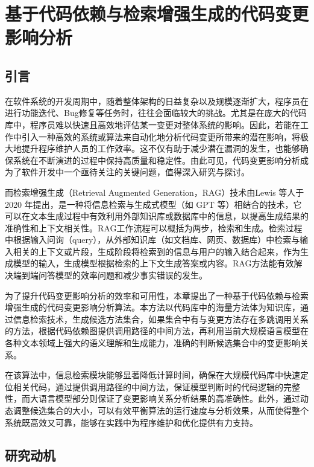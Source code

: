 \chapter{基于代码依赖与检索增强生成的代码变更影响分析}

\section{引言}

在软件系统的开发周期中，随着整体架构的日益复杂以及规模逐渐扩大，程序员在进行功能迭代、Bug修复等任务时，往往会面临较大的挑战。尤其是在庞大的代码库中，程序员难以快速且高效地评估某一变更对整体系统的影响。因此，若能在工作中引入一种高效的系统或算法来自动化地分析代码变更所带来的潜在影响，将极大地提升程序维护人员的工作效率。这不仅有助于减少潜在漏洞的发生，也能够确保系统在不断演进的过程中保持高质量和稳定性。由此可见，代码变更影响分析成为了软件开发中一个亟待关注的关键问题，值得深入研究与探讨。

而检索增强生成（Retrieval Augmented Generation，RAG）技术由Lewis 等人\cite{2020Retrieval}于 2020 年提出，是一种将信息检索与生成式模型（如 GPT 等）相结合的技术，它可以在文本生成过程中有效利用外部知识库或数据库中的信息，以提高生成结果的准确性和上下文相关性。RAG工作流程可以概括为两步，检索和生成。检索过程中根据输入问询（query），从外部知识库（如文档库、网页、数据库）中检索与输入相关的上下文或片段，生成阶段将检索到的信息与用户的输入结合起来，作为生成模型的输入，生成模型根据检索的上下文生成答案或内容。RAG方法能有效解决端到端问答模型的效率问题和减少事实错误的发生。

为了提升代码变更影响分析的效率和可用性，本章提出了一种基于代码依赖与检索增强生成的代码变更影响分析算法。本方法以代码库中的海量方法体为知识库，通过信息检索技术，生成候选方法集合，如果集合中有与变更方法存在多跳调用关系的方法，根据代码依赖图提供调用路径的中间方法，再利用当前大规模语言模型在各种文本领域上强大的语义理解和生成能力，准确的判断候选集合中的变更影响关系。

在该算法中，信息检索模块能够显著降低计算时间，确保在大规模代码库中快速定位相关代码，通过提供调用路径的中间方法，保证模型判断时的代码逻辑的完整性，而大语言模型部分则保证了变更影响关系分析结果的高准确性。此外，通过动态调整候选集合的大小，可以有效平衡算法的运行速度与分析效果，从而使得整个系统既高效又可靠，能够在实践中为程序维护和优化提供有力支持。

\section{研究动机}

